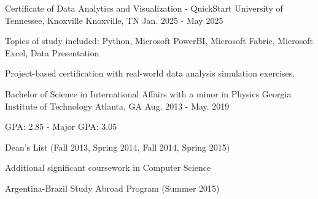 

\begin{cventries}
	
\cventry
	{Certificate of Data Analytics and Visualization - QuickStart} %
	{University of Tennessee, Knoxville} %
	{Knoxville, TN} %
	{Jan. 2025 - May 2025} %
	{
		\begin{cvitems} %
			\item {Topics of study included: Python, Microsoft PowerBI, Microsoft Fabric, Microsoft Excel, Data Presentation}
			\item {Project-based certification with real-world data analysis simulation exercises.}
		\end{cvitems}
	}
	\vspace{4mm}

  \cventry
    {Bachelor of Science in International Affairs with a minor in Physics} %
    {Georgia Institute of Technology} %
    {Atlanta, GA} %
    {Aug. 2013 - May. 2019} %
    {
      \begin{cvitems} %
        \item {GPA: 2.85 - Major GPA: 3.05}
        \item {Dean's List (Fall 2013, Spring 2014, Fall 2014, Spring 2015)}
        \item {Additional significant coursework in Computer Science}
        \item {Argentina-Brazil Study Abroad Program (Summer 2015)}
      \end{cvitems}
    }
    \vspace{4mm}

\end{cventries}
